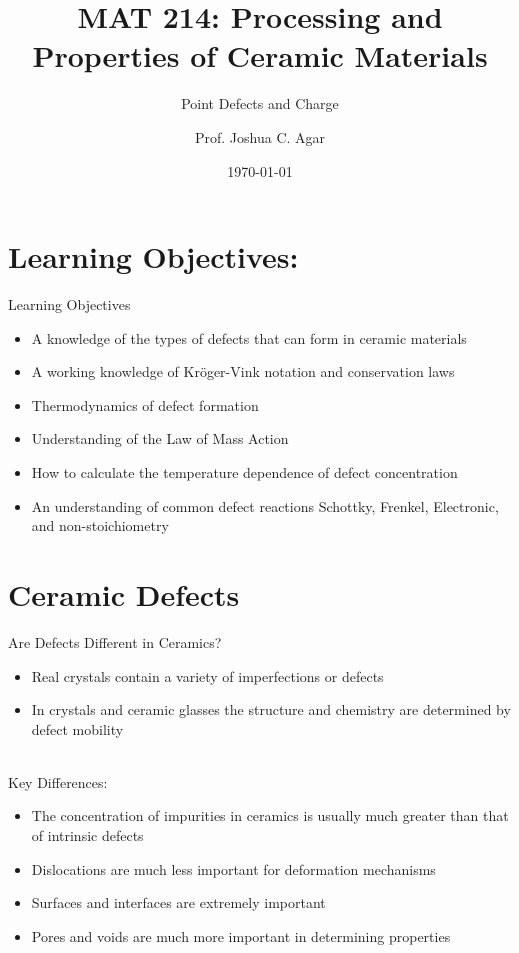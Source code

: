 \documentclass{libs/XJTLU_format}
\title[MAT 214 Spring 2022]{\textbf{MAT 214: Processing and Properties of Ceramic Materials}}
\subtitle{Point Defects and Charge}
\author{Prof. Joshua C. Agar}
\institute[Lehigh University]{
    \normalsize{\email{jca318@lehigh.edu}}
    \newline
    \department{Materials Science and Engineering}
    \newline
    \university{Lehigh Univeristy}
}
\date{\today}
\begin{document}


\begin{frame}{}
    \maketitle
\end{frame}

\section{Learning Objectives:}
\begin{frame}{Learning Objectives}
\begin{itemize}
    \item A knowledge of the types of defects that can form in ceramic materials
    \pause
    \item A working knowledge of Kröger-Vink notation and conservation laws
    \pause
    \item Thermodynamics of defect formation
    \pause
    \item Understanding of the Law of Mass Action
    \pause
    \item How to calculate the temperature dependence of defect concentration
    \pause
    \item An understanding of common defect reactions Schottky, Frenkel, Electronic, and non-stoichiometry
\end{itemize}
    
\end{frame}

\section{Ceramic Defects}
\begin{frame}{Are Defects Different in Ceramics?}
    \begin{itemize}
        \item<1-> Real crystals contain a variety of imperfections or defects
        \item<2-> In crystals and ceramic glasses the structure and chemistry are determined by defect mobility
    \end{itemize} \\[0.3cm]
    
    \pause
    Key Differences:\\[0.3cm]
    \begin{itemize}
        \item<3-> The concentration of impurities in ceramics is usually much greater than that of intrinsic defects
        \item<4-> Dislocations are much less important for deformation mechanisms
        \item<5-> Surfaces and interfaces are extremely important
        \item<6-> Pores and voids are much more important in determining properties
    \end{itemize}
\end{frame}
\end{document}
